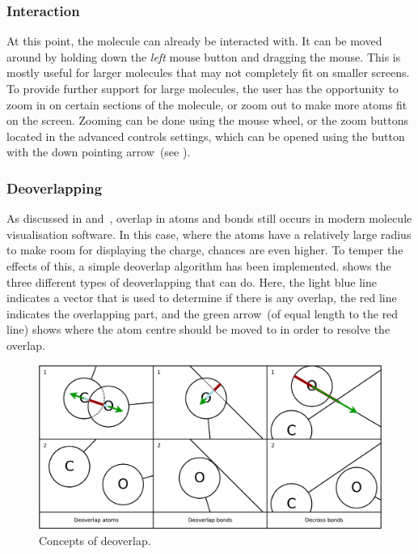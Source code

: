 \subsubsection{Interaction}
At this point, the molecule can already be interacted with. It can be moved around by holding down the \emph{left} mouse button and dragging the mouse. This is mostly useful for larger molecules that may not completely fit on smaller screens. To provide further support for large molecules, the user has the opportunity to zoom in on certain sections of the molecule, or zoom out to make more atoms fit on the screen. Zooming can be done using the mouse wheel, or the zoom buttons located in the advanced controls settings, which can be opened using the button with the down pointing arrow~(see ).


\subsubsection{Deoverlapping}
As discussed in  and~\cite{clark2006structure}, overlap in atoms and bonds still occurs in modern molecule visualisation software. In this case, where the atoms have a relatively large radius to make room for displaying the charge, chances are even higher. To temper the effects of this, a simple deoverlap algorithm has been implemented.  shows the three different types of deoverlapping that \oframp{} can do. Here, the light blue line indicates a vector that is used to determine if there is any overlap, the red line indicates the overlapping part, and the green arrow~(of equal length to the red line) shows where the atom centre should be moved to in order to resolve the overlap.

\begin{figure}
\center
\includegraphics[width=\textwidth]{img/deoverlap.pdf}
\caption{Concepts of deoverlap.}
\end{figure}

